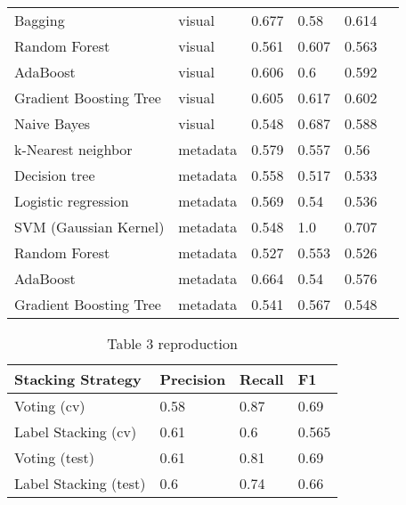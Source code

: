 \documentclass[sigconf]{acmart}
\begin{document}
\begin{table}[hbt!]
\begin{tabular}{llllll}
    Bagging                & visual   & 0.677     & 0.58   & 0.614 \\ %
    Random Forest          & visual   & 0.561     & 0.607  & 0.563 \\ %
    AdaBoost               & visual   & 0.606     & 0.6    & 0.592 \\ %
    Gradient Boosting Tree & visual   & 0.605     & 0.617  & 0.602 \\ %
    Naive Bayes            & visual   & 0.548     & 0.687  & 0.588 \\ %
    k-Nearest neighbor     & metadata & 0.579     & 0.557  & 0.56  \\ %
    Decision tree          & metadata & 0.558     & 0.517  & 0.533 \\ %
    Logistic regression    & metadata & 0.569     & 0.54   & 0.536 \\ %
    SVM (Gaussian Kernel)  & metadata & 0.548     & 1.0    & 0.707 \\ %
    Random Forest          & metadata & 0.527     & 0.553  & 0.526 \\ %
    AdaBoost               & metadata & 0.664     & 0.54   & 0.576 \\ %
    Gradient Boosting Tree & metadata & 0.541     & 0.567  & 0.548 \\ \hline %
  \end{tabular}
\end{table}

\begin{table}[hbt!]
  \caption*{Table 3 reproduction}
  \begin{tabular}{llll}
    \hline
    Stacking Strategy     & Precision & Recall & F1    \\ \hline
    Voting (cv)           & 0.58      & 0.87   & 0.69  \\
    Label Stacking (cv)   & 0.61      & 0.6    & 0.565 \\
    Voting (test)         & 0.61      & 0.81   & 0.69  \\
    Label Stacking (test) & 0.6       & 0.74   & 0.66  \\ \hline
  \end{tabular}
\end{table}
\end{document}

